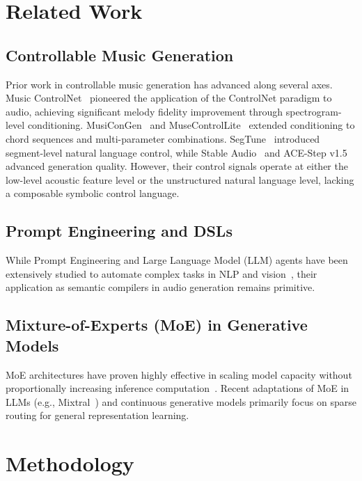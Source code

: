 \documentclass[conference]{IEEEtran}
\begin{document}
\section{Related Work}

\subsection{Controllable Music Generation}
Prior work in controllable music generation has advanced along several axes. Music ControlNet~\cite{musiccontrolnet} pioneered the application of the ControlNet paradigm to audio, achieving significant melody fidelity improvement through spectrogram-level conditioning. MusiConGen~\cite{musecong} and MuseControlLite~\cite{muselite} extended conditioning to chord sequences and multi-parameter combinations. SegTune~\cite{segtune} introduced segment-level natural language control, while Stable Audio~\cite{stableaudio} and ACE-Step v1.5~\cite{acestep} advanced generation quality. However, their control signals operate at either the low-level acoustic feature level or the unstructured natural language level, lacking a composable symbolic control language.

\subsection{Prompt Engineering and DSLs}
While Prompt Engineering and Large Language Model (LLM) agents have been extensively studied to automate complex tasks in NLP and vision~\cite{llm_agent}, their application as semantic compilers in audio generation remains primitive.

\subsection{Mixture-of-Experts (MoE) in Generative Models}
MoE architectures have proven highly effective in scaling model capacity without proportionally increasing inference computation~\cite{switch_transformer}. Recent adaptations of MoE in LLMs (e.g., Mixtral~\cite{mixtral}) and continuous generative models primarily focus on sparse routing for general representation learning.

\section{Methodology}
\end{document}
